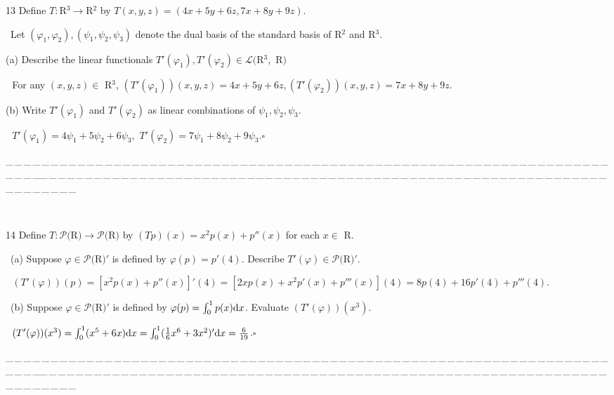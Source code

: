 \documentclass[a4paper, 11pt, UTF8]{article}
\def\d{\textup{d}}
\def\Lm{\mathcal{L}}
\def\Po{\mathcal{P}}
\begin{document}
\begin{large}
{\timesbf\Large 13} {\timessl\Large
Define $T:${\timesbf R}$^3\rightarrow${\timesbf R}$^2$ by $T(x,y,z)=(4x+5y+6z,7x+8y+9z)$.}\par\quad\,
{\timessl\Large Let $(\varphi_1,\varphi_2),(\psi_1,\psi_2,\psi_3)$ denote the dual basis of the standard basis of {\timesbf R}$^2$ and {\timesbf R}$^3$.}\par\quad
(a) {\timessl\Large Describe the linear functionals $T'(\varphi_1),T'(\varphi_2)\in\Lm(${\timesbf R}$^3,$ {\timesbf R}$)$}\par\qquad\,\,
For any $(x,y,z)\in$ {\timesbf R}$^3$, $(T'(\varphi_1))(x,y,z)=4x+5y+6z, (T'(\varphi_2))(x,y,z)=7x+8y+9z$.\par\quad
(b) {\timessl\Large Write $T'(\varphi_1)$ and $T'(\varphi_2)$ as linear combinations of $\psi_1,\psi_2,\psi_3$.
}\par\qquad\,\,
$T'(\varphi_1)=4\psi_1+5\psi_2+6\psi_3,\,\,
T'(\varphi_2)=7\psi_1+8\psi_2+9\psi_3$.\qquad\qquad\qquad\qquad\qquad\qquad\qquad\qquad$\square$
\par

{\tiny \_\,\_\,\_\,\_\,\_\,\_\,\_\,\_\,\_\,\_\,\_\,\_\,\_\,\_\,\_\,\_\,\_\,\_\,\_\,\_\,\_\,\_\,\_\,\_\,\_\,\_\,\_\,\_\,\_\,\_\,\_\,\_\,\_\,\_\,\_\,\_\,\_\,\_\,\_\,\_\,\_\,\_\,\_\,\_\,\_\,\_\,\_\,\_\,\_\,\_\,\_\,\_\,\_\,\_\,\_\,\_\,\_\,\_\,\_\,\_\,\_\,\_\,\_\,\_\,\_\,\_\,\_\,\_\,\_\,\_\,\_\_\,\_\,\_\,\_\,\_\,\_\,\_\,\_\,\_\,\_\,\_\,\_\,\_\,\_\,\_\,\_\,\_\,\_\,\_\,\_\,\_\,\_\,\_\,\_\,\_\,\_\,\_\,\_\,\_\,\_\,\_\,\_\,\_\,\_\,\_\,\_\,\_\,\_\,\_\,\_\,\_\,\_\,\_\,\_\,\_\,\_\,\_\,\_\,\_\,\_\,\_\,\_\,\_\,\_\,\_\,\_\,\_\,\_\,\_\,\_\,\_\,\_\,\_\,\_\,\_\,\_\,\_\,\_\,\_\,\_\,\_}{\tiny\,\par}

{\timesbf\Large 14} {\timessl\Large
Define $T:\Po(${\timesbf R}$)\rightarrow\Po(${\timesbf R}$)$ by $(Tp)(x)=x^2 p(x)+p''(x)$ for each $x\in$ {\timesbf R}.}\par\quad\,
(a) {\timessl Suppose $\varphi\in\Po(${\timesbf R}$)'$ is defined by $\varphi(p)=p'(4)$. Describe $T'(\varphi)\in\Po(${\timesbf R}$)'$.}\par\qquad\,\,
$(T'(\varphi))(p)=[x^2p(x)+p''(x)]'(4)=[2xp(x)+x^2p'(x)+p'''(x)](4)=8p(4)+16p'(4)+p'''(4)$.
\par\quad\,
(b) {\timessl Suppose $\varphi\in\Po(${\timesbf R}$)'$ is defined by
$\varphi(p)=\int_0^1 p(x)\d x$. Evaluate $(T'(\varphi))(x^3)$.}\par\qquad\,\,
$(T'(\varphi))(x^3)=\int_0^1(x^5+6x)\d x=\int_0^1(\frac{1}{6}x^6+3x^2)'\d x=\frac{6}{19}$.\qquad\qquad\qquad\qquad\qquad\qquad\qquad\qquad$\square$
\par
{\tiny \_\,\_\,\_\,\_\,\_\,\_\,\_\,\_\,\_\,\_\,\_\,\_\,\_\,\_\,\_\,\_\,\_\,\_\,\_\,\_\,\_\,\_\,\_\,\_\,\_\,\_\,\_\,\_\,\_\,\_\,\_\,\_\,\_\,\_\,\_\,\_\,\_\,\_\,\_\,\_\,\_\,\_\,\_\,\_\,\_\,\_\,\_\,\_\,\_\,\_\,\_\,\_\,\_\,\_\,\_\,\_\,\_\,\_\,\_\,\_\,\_\,\_\,\_\,\_\,\_\,\_\,\_\,\_\,\_\,\_\,\_\_\,\_\,\_\,\_\,\_\,\_\,\_\,\_\,\_\,\_\,\_\,\_\,\_\,\_\,\_\,\_\,\_\,\_\,\_\,\_\,\_\,\_\,\_\,\_\,\_\,\_\,\_\,\_\,\_\,\_\,\_\,\_\,\_\,\_\,\_\,\_\,\_\,\_\,\_\,\_\,\_\,\_\,\_\,\_\,\_\,\_\,\_\,\_\,\_\,\_\,\_\,\_\,\_\,\_\,\_\,\_\,\_\,\_\,\_\,\_\,\_\,\_\,\_\,\_\,\_\,\_\,\_\,\_\,\_\,\_\,\_}\par


\end{large}
\end{document}
